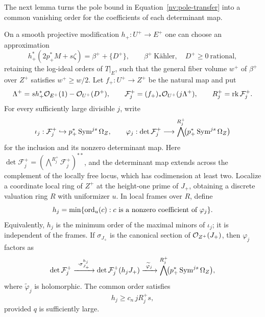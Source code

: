 The next lemma turns the pole bound in
Equation~\eqref{nv:pole-transfer} into a common vanishing order for the
coefficients of each determinant map.

\begin{lemma}\label{nv:determinant-order}
On a smooth projective modification \(h_+:U^+\to E^+\) one can choose
an approximation
\begin{equation}\label{nv:plus-decomposition}
 h_+^*(2p_+^*M+s\zeta)=\beta^++\{D^+\},
 \qquad \beta^+\ \text{Kähler},\quad D^+\ge0\ \text{rational},
\end{equation}
retaining the log-ideal orders of \(T|_E\), such that the general
fiber volume \(w^+\) of \(\beta^+\) over \(Z^+\) satisfies
\(w^+\ge w/2\).  Let \(f_+:U^+\to Z^+\) be the natural map and put
\[
 \Lambda^+=s h_+^*\mathcal O_{E^+}(1)-\mathcal O_{U^+}(D^+),\qquad
 \mathcal F_j^+=(f_+)_*\mathcal O_{U^+}(j\Lambda^+),\qquad
 R_j^+=\operatorname{rk}\mathcal F_j^+ .
\]
For every sufficiently large divisible \(j\), write
\[
 \iota_j:\mathcal F_j^+\hookrightarrow p_+^*\operatorname{Sym}^{js}\Omega_Z,\qquad
 \varphi_j:\det\mathcal F_j^+\longrightarrow
       \bigwedge^{R_j^+}\!\bigl(p_+^*\operatorname{Sym}^{js}\Omega_Z\bigr)
\]
for the inclusion and its nonzero determinant map.  Here
\(\det\mathcal F_j^+=(\bigwedge^{R_j^+}\mathcal F_j^+)^{**}\), and the
determinant map extends across the complement of the locally free locus,
which has codimension at least two.
Localize a coordinate local ring of \(Z^+\) at the height-one prime of
\(J_+\), obtaining a discrete valuation ring \(R\) with uniformizer \(u\).
In local frames over \(R\), define
\[
 h_j=\min\{\operatorname{ord}_u(c):c\text{ is a nonzero coefficient of }\varphi_j\}.
\]
Equivalently, \(h_j\) is the minimum order of the maximal minors of
\(\iota_j\); it is independent of the frames.  If \(\sigma_{J_+}\) is the
canonical section of \(\mathcal O_{Z^+}(J_+)\), then \(\varphi_j\) factors as
\[
 \det\mathcal F_j^+
 \xrightarrow{\ \cdot\sigma_{J_+}^{h_j}\ }
 \det\mathcal F_j^+(h_jJ_+)
 \xrightarrow{\ \widetilde\varphi_j\ }
 \bigwedge^{R_j^+}\!\bigl(p_+^*\operatorname{Sym}^{js}\Omega_Z\bigr),
\]
where \(\widetilde\varphi_j\) is holomorphic.  The common order satisfies
\begin{equation}\label{nv:determinant-order-equation}
 h_j\ge c_n\,jR_j^+s ,
\end{equation}
provided \(q\) is sufficiently large.
\end{lemma}


